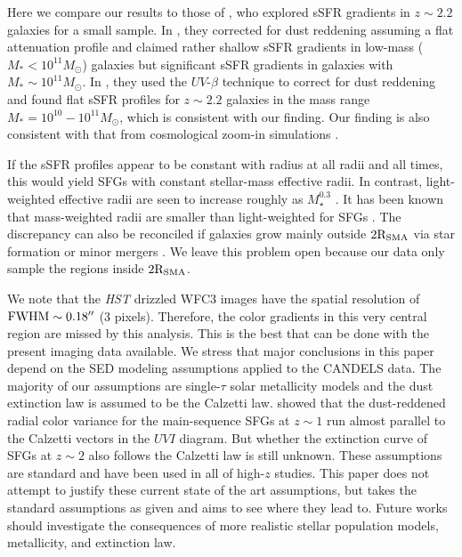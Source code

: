 \documentclass[twocolumn]{aastex61}
\begin{document}
Here we compare our results to those of \citet[][]{Tacchella15,Tacchella17}, 
who explored sSFR gradients in $z\sim2.2$ galaxies for a small sample. 
In \citet[][]{Tacchella15}, 
%
they corrected for dust reddening assuming a flat attenuation profile and 
claimed rather shallow sSFR gradients in low-mass ($M_{\ast} < 10^{11}M_{\odot}$) galaxies 
but significant sSFR gradients in galaxies with $M_{\ast} \sim 10^{11}M_{\odot}$. 
In \citet[][]{Tacchella17}, 
they used the $UV$-$\beta$ technique to correct for dust reddening 
and found flat sSFR profiles for $z\sim2.2$ galaxies in the mass range $M_{\ast} = 10^{10}-10^{11}M_{\odot}$, 
which is consistent with our finding. 
Our finding is also consistent with that from cosmological zoom-in simulations \citep[][]{Tacchella16}.

If the sSFR profiles appear to be constant with radius 
at all radii and all times, this would yield SFGs with constant stellar-mass effective radii. 
In contrast, light-weighted effective radii are seen to 
increase roughly as $M_{\star}^{0.3}$ \citep[e.g.,][]{Patel13,vDokkum13}. 
It has been known that mass-weighted radii are smaller than 
light-weighted for SFGs \citep[][]{Szomoru13}. 
The discrepancy can also be reconciled if galaxies grow mainly outside $\rm 2R_{SMA}$ 
via star formation \citep[][]{Tacchella16} or minor mergers 
\citep[][]{Welker17}. We leave this problem open because 
our data only sample the regions inside $\rm 2R_{SMA}$.


We note that the {\it HST} drizzled WFC3 images have the spatial resolution of 
$\rm FWHM \sim 0.18^{\prime\prime}$ (3 pixels). Therefore, the color gradients 
in this very central region are missed by this analysis.
This is the best that can be done with the present imaging data available.
%
We stress that major conclusions in this paper depend on the SED modeling 
assumptions applied to the CANDELS data. 
The majority of our assumptions are single-$\tau$ solar metallicity models and 
the dust extinction law is assumed to be the Calzetti law.
%
\citet[][]{Wang17} showed that the dust-reddened radial color variance for the main-sequence SFGs 
at $z\sim1$ run almost parallel to the Calzetti vectors in the $UVI$ diagram. 
But whether the extinction curve of SFGs at $z\sim2$ also follows the Calzetti law is still unknown. 
These assumptions are standard and have been used in all of high-$z$ studies. 
This paper does not attempt to justify these current state of the art assumptions, but 
takes the standard assumptions as given and aims to see where they lead to. 
Future works should investigate the consequences 
of more realistic stellar population models, metallicity, and extinction law.   
\end{document}
